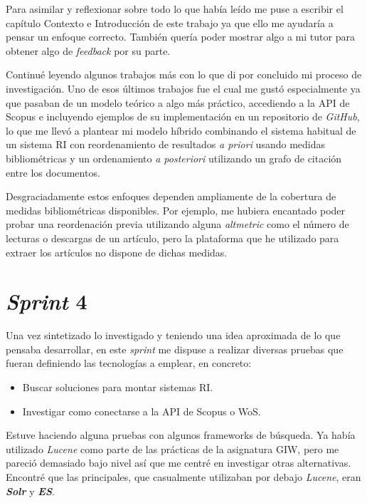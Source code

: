 Para asimilar y reflexionar sobre todo lo que había leído me puse a escribir el capítulo Contexto e Introducción de este trabajo ya que ello me ayudaría a pensar un enfoque correcto. También quería poder mostrar algo a mi tutor para obtener algo de \textit{feedback} por su parte.

Continué leyendo algunos trabajos más con lo que di por concluido mi proceso de investigación. Uno de esos últimos trabajos fue \cite{DBLP:conf/ecir/SarolLS18} el cual me gustó especialmente ya que pasaban de un modelo teórico a algo más práctico, accediendo a la \acrshort{API} de Scopus e incluyendo ejemplos de su implementación en un repositorio de \textit{GitHub}, lo que me llevó a plantear mi modelo híbrido combinando el sistema habitual de un sistema \acrshort{RI} con reordenamiento de resultados \textit{a priori} usando medidas bibliométricas y un ordenamiento \textit{a posteriori} utilizando un grafo de citación entre los documentos.

Desgraciadamente estos enfoques dependen ampliamente de la cobertura de medidas bibliométricas disponibles. Por ejemplo, me hubiera encantado poder probar una reordenación previa utilizando alguna \textit{altmetric} como el número de lecturas o descargas de un artículo, pero la plataforma que he utilizado para extraer los artículos no dispone de dichas medidas.

\section{\textit{Sprint} 4}
\label{sc:sprint4}
Una vez sintetizado lo investigado y teniendo una idea aproximada de lo que pensaba desarrollar, en este \textit{sprint} me dispuse a realizar diversas pruebas que fueran definiendo las tecnologías a emplear, en concreto:
\begin{itemize}
	\item Buscar soluciones para montar sistemas \acrshort{RI}.
	\item Investigar como conectarse a la \acrshort{API} de Scopus o \acrshort{WoS}.
\end{itemize}

Estuve haciendo alguna pruebas con algunos \glspl{framework} de búsqueda. Ya había utilizado \textit{Lucene} como parte de las prácticas de la asignatura \acrshort{GIW}, pero me pareció demasiado bajo nivel así que me centré en investigar otras alternativas. Encontré que las principales, que casualmente utilizaban por debajo \textit{Lucene}, eran \textit{\textbf{Solr}} y \textit{\textbf{\acrfull{ES}}}.

